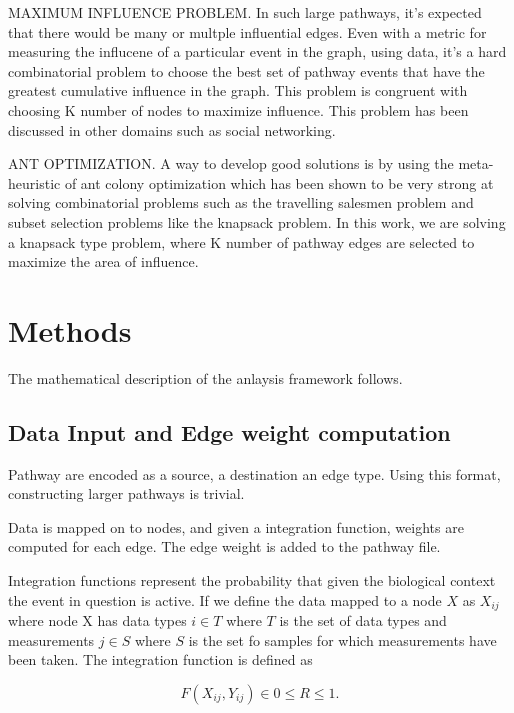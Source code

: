 \documentclass[twoside]{article}
\begin{document}
\begin{multicols}{2}
MAXIMUM INFLUENCE PROBLEM. In such large pathways, it's expected that there would be many or
multple influential edges. Even with a metric for measuring the
influcene of a particular event in the graph, using data, it's a hard
combinatorial problem to choose the best set of pathway events that
have the greatest cumulative influence in the graph. This problem is
congruent with choosing K number of nodes to maximize influence. This
problem has been discussed in other domains such as social
networking. 

ANT OPTIMIZATION. A way to develop good solutions is by using the meta-heuristic of ant
colony optimization which has been shown to be very strong at solving
combinatorial problems such as the travelling salesmen problem and
subset selection problems like the knapsack problem. In this work, we
are solving a knapsack type problem, where K number of pathway edges
are selected to maximize the area of influence.



\section{Methods}

The mathematical description of the anlaysis framework follows.

\subsection{Data Input and Edge weight computation}

Pathway are encoded as a source, a destination an edge type. Using
this format, constructing larger pathways is trivial.

Data is mapped on to nodes, and given a integration function, weights
are computed for each edge. The edge weight is added to the pathway
file. 


Integration functions represent the probability that given the
biological context the event in question is active. If we define 
the data mapped to a node $X$ as $X_{ij}$ where node X
has data types $i \in T$ where $T$ is the set of data types and
measurements $j \in S$ where $S$ is the set fo samples for which
measurements have been taken.  The integration function is defined as

\begin{equation}
\label{integration-function}
F(X_{ij} , Y_{ij}) \in 0 \le R \le 1 .
\end{equation}



\end{multicols}
\end{document}
